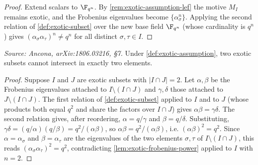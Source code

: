 \begin{proof}
  Extend scalars to \(\F_{q^n}\). By \cref{rem:exotic-assumption-lef} the motive
  \(M_I\) remains exotic, and the Frobenius eigenvalues become
  \(\{\alpha_\sigma^n\}\). Applying the second relation of
  \cref{def:exotic-subset} over the new base field \(\F_{q^n}\) (whose cardinality
  is \(q^n\)) gives \((\alpha_\sigma \alpha_\tau)^n \neq q^n\) for all distinct
  \(\sigma, \tau \in I\).
\end{proof}

\begin{lemma}
  \label{lem:exotic-no-two}
  \textit{Source: Ancona, arXiv:1806.03216, §7.}
  Under \cref{def:exotic-assumption}, two exotic subsets cannot intersect in
  exactly two elements.
\end{lemma}

\begin{proof}
  Suppose \(I\) and \(J\) are exotic subsets with \(|I \cap J| = 2\). Let
  \(\alpha, \beta\) be the Frobenius eigenvalues attached to \(I \setminus
  (I \cap J)\) and \(\gamma, \delta\) those attached to \(J \setminus (I \cap
  J)\). The first relation of \cref{def:exotic-subset} applied to \(I\) and to
  \(J\) (whose products both equal \(q^2\) and share the factors over
  \(I \cap J\)) gives \(\alpha\beta = \gamma\delta\). The second relation gives,
  after reordering, \(\alpha = q/\gamma\) and \(\beta = q/\delta\). Substituting,
  \(\gamma\delta = (q/\alpha)(q/\beta) = q^2/(\alpha\beta)\), so
  \(\alpha\beta = q^2/(\alpha\beta)\), i.e. \((\alpha\beta)^2 = q^2\). Since
  \(\alpha = \alpha_\sigma\) and \(\beta = \alpha_\tau\) are the eigenvalues of
  the two elements \(\sigma, \tau\) of \(I \setminus (I \cap J)\), this reads
  \((\alpha_\sigma \alpha_\tau)^2 = q^2\), contradicting
  \cref{lem:exotic-frobenius-power} applied to \(I\) with \(n = 2\).
\end{proof}

